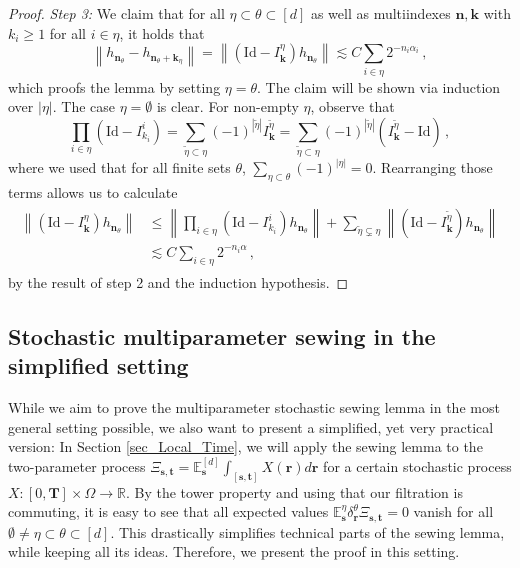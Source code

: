 \documentclass[11pt,oneside,english,reqno]{amsart}
\numberwithin{equation}{section}
\numberwithin{figure}{section}
\theoremstyle{plain}
\theoremstyle{definition}
\theoremstyle{remark}
\theoremstyle{plain}
\theoremstyle{plain}
\theoremstyle{plain}
\theoremstyle{plain}
\theoremstyle{plain}
\newcommand{\EE}{\mathbb{E}}
\newcommand{\RR}{\mathbb{R}}
\newcommand{\bk}{\mathbf{k}}
\newcommand{\bn}{\mathbf{n}}
\newcommand{\br}{\mathbf{r}}
\newcommand{\bT}{\mathbf{T}}
\newcommand{\bs}{\mathbf{s}}
\newcommand{\bt}{\mathbf{t}}
\newcommand{\Id}{\mathrm{Id}}
\newcommand{\norm}[1]{\left\lVert #1\right\rVert}
\newcommand{\abs}[1]{\left\lvert #1\right\rvert}
\begin{document}
\begin{proof}
\bigskip

    \noindent\emph{Step 3:} We claim that for all $\eta\subset\theta\subset[d]$ as well as multiindexes $\bn,\bk$ with $k_i\ge 1$ for all $i\in\eta$, it holds that
%
    \begin{equation*}
        \norm{h_{\bn_\theta}-h_{\bn_\theta+\bk_\eta}} = \norm{(\Id-I^\eta_\bk)h_{\bn_\theta}}\lesssim C\sum_{i\in\eta}2^{-n_i\alpha_i}\,,
    \end{equation*}
%
    which proofs the lemma by setting $\eta = \theta$. The claim will be shown via induction over $\abs{\eta}$. The case $\eta = \emptyset$ is clear. For non-empty $\eta$, observe that 
%
    \begin{equation*}
        \prod_{i\in\eta}(\Id-I^i_{k_i}) = \sum_{\tilde\eta\subset\eta}(-1)^{\abs{\tilde\eta}} I^{\tilde\eta}_{\bk} = \sum_{\tilde\eta\subset\eta}(-1)^{\abs{\tilde\eta}} (I^{\tilde\eta}_{\bk}-\Id)\,,
    \end{equation*}
%
    where we used that for all finite sets $\theta$, $\sum_{\eta\subset\theta}(-1)^{\abs\eta} =0$. Rearranging those terms allows us to calculate
%
    \begin{align}\begin{split}\label{calc3technicalLema}
        \norm{(\Id-I^\eta_\bk)h_{\bn_\theta}} &\le \norm{\prod_{i\in\eta}(\Id-I^i_{k_i})h_{\bn_\theta}} + \sum_{\tilde\eta\subsetneq \eta}\norm{(\Id-I^{\tilde\eta}_{\bk})h_{\bn_\theta}} \\
        &\lesssim C\sum_{i\in\eta}2^{-n_i\alpha}\,,
    \end{split}\end{align}
%
    by the result of step 2 and the induction hypothesis.
\end{proof}

\subsection{Stochastic multiparameter sewing in the simplified setting}

While we aim to prove the multiparameter stochastic sewing lemma in the most general setting possible, we also want to present a simplified, yet very practical version: In Section \ref{sec_Local_Time}, we will apply the sewing lemma to the two-parameter process $\Xi_{\bs,\bt} = \EE_\bs^{[d]}\int_{[\bs,\bt]} X(\br) d\br$ for a certain stochastic process $X:[0,\bT]\times\Omega\to\RR$. By the tower property and using that our filtration is commuting, it is easy to see that all expected values $\EE_\bs^\eta \delta^\theta_\br\Xi_{\bs,\bt} = 0$ vanish for all $\emptyset\neq\eta\subset\theta\subset[d]$. This drastically simplifies technical parts of the sewing lemma, while keeping all its ideas. Therefore, we present the proof in this setting.
\end{document}

